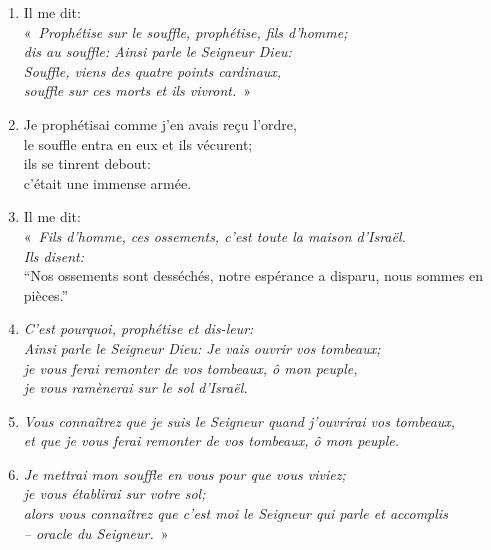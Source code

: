 \begin{enumerate}[leftmargin=\psleftmargin, labelsep = \pslabelsep, label={\arabic*}, font=\color{\pscolor}\small\textsuperscript, parsep=0em, itemsep=0em, topsep=0em ]
\item Il me dit: \\ \decalage «~\textit{Prophétise sur le souffle, prophétise, fils d’homme; \\ \decalage dis au souffle: Ainsi parle le Seigneur Dieu: \\ \decalage Souffle, viens des quatre points cardinaux, \\ \decalage souffle sur ces morts et ils vivront.}~»
\item Je prophétisai comme j’en avais reçu l’ordre, \\ le souffle entra en eux et ils vécurent; \\ ils se tinrent debout: \\ c’était une immense armée.\verseSpace
\item Il me dit: \\ \decalage «~\textit{Fils d’homme, ces ossements, c’est toute la maison d’Israël. \\ \decalage Ils disent:} \\ \decalage \decalage  “Nos ossements sont desséchés, notre espérance a disparu, nous sommes en pièces.”
\item \decalage \textit{C’est pourquoi, prophétise et dis-leur: \\ \decalage Ainsi parle le Seigneur Dieu: Je vais ouvrir vos tombeaux; \\ \decalage je vous ferai remonter de vos tombeaux, ô mon peuple, \\ \decalage je vous ramènerai sur le sol d’Israël.}
\item \decalage \textit{Vous connaîtrez que je suis le Seigneur quand j’ouvrirai vos tombeaux, \\ \decalage et que je vous ferai remonter de vos tombeaux, ô mon peuple.}
\item \decalage \textit{Je mettrai mon souffle en vous pour que vous viviez; \\ \decalage je vous établirai sur votre sol; \\ \decalage alors vous connaîtrez que c’est moi le Seigneur qui parle et accomplis \\ \decalage – oracle du Seigneur.}~»\parSpace

\end{enumerate}

